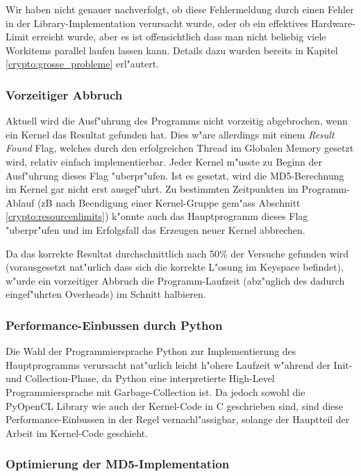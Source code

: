 \begin{refsection}
Wir haben nicht genauer nachverfolgt, ob diese Fehlermeldung durch einen Fehler
in der Library-Implementation verursacht wurde, oder ob ein effektives
Hardware-Limit erreicht wurde, aber es ist offensichtlich dass man nicht
beliebig viele Workitems parallel laufen lassen kann. Details dazu wurden
bereits in Kapitel \ref{crypto:grosse_probleme} erl"autert.

\subsubsection{Vorzeitiger Abbruch}

Aktuell wird die Ausf"uhrung des Programms nicht vorzeitig abgebrochen, wenn ein
Kernel das Resultat gefunden hat. Dies w"are allerdings mit einem \textit{Result
Found} Flag, welches durch den erfolgreichen Thread im Globalen Memory gesetzt
wird, relativ einfach implementierbar. Jeder Kernel m"usste zu Beginn der
Ausf"uhrung dieses Flag "uberpr"ufen. Ist es gesetzt, wird die MD5-Berechnung im
Kernel gar nicht erst ausgef"uhrt. Zu bestimmten Zeitpunkten im Programm-Ablauf
(zB nach Beendigung einer Kernel-Gruppe gem"ass Abschnitt
\ref{crypto:resourcenlimits}) k"onnte auch das Hauptprogramm dieses Flag
"uberpr"ufen und im Erfolgsfall das Erzeugen neuer Kernel abbrechen.

Da das korrekte Resultat durchschnittlich nach 50\% der Versuche gefunden wird
(vorausgesetzt nat"urlich dass sich die korrekte L"osung im Keyspace befindet),
w"urde ein vorzeitiger Abbruch die Programm-Laufzeit (abz"uglich des dadurch
eingef"uhrten Overheads) im Schnitt halbieren.

\subsubsection{Performance-Einbussen durch Python}

Die Wahl der Programmiersprache Python zur Implementierung des Hauptprogramms
verursacht nat"urlich leicht h"ohere Laufzeit w"ahrend der Init- und
Collection-Phase, da Python eine interpretierte High-Level Programmiersprache
mit Garbage-Collection ist. Da jedoch sowohl die PyOpenCL Library wie auch der
Kernel-Code in C geschrieben sind, sind diese Performance-Einbussen in der Regel
vernachl"assigbar, solange der Hauptteil der Arbeit im Kernel-Code geschieht.

\subsubsection{Optimierung der MD5-Implementation}


\end{refsection}
